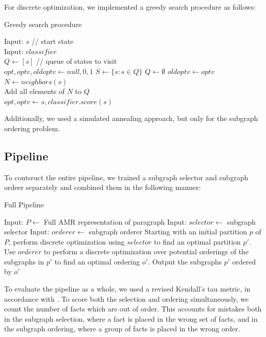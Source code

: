 \documentclass[12pt]{article}
\begin{document}
For discrete optimization, we implemented a greedy search procedure as follows:
\begin{algorithm}
\caption{Greedy search procedure}
\label{greedy_search_alg}
\begin{algorithmic}
\STATE Input: $s$ // start state \\
\STATE Input: $classifier$ \\
\STATE $Q \gets [s]$ // queue of states to visit \\
\STATE $opt, optv, oldoptv \gets null, 0, 1$
    \STATE $S \gets \{s: s \in Q \}$
    \STATE $Q \gets \emptyset$
    \STATE $oldoptv \gets optv$
        \STATE $N \gets neighbors(s)$\\
        \STATE Add all elements of $N$ to $Q$\\
            \STATE $opt, optv \gets s, classifier.score(s)$\\
        \ENDIF
    \ENDFOR
\ENDWHILE
\end{algorithmic}
\end{algorithm}

Additionally, we used a simulated annealing approach, but only for the
subgraph ordering problem.

\subsection{Pipeline}

To contsruct the entire pipeline, we trained a subgraph selector and subgraph
ordeer separately and combined them in the following manner:

\begin{algorithm}
\caption{Full Pipeline}
\label{pipeline_procedure}
\begin{algorithmic}
\STATE Input: $P \gets$ Full AMR representation of paragraph
\STATE Input: $selector \gets$ subgraph selector
\STATE Input: $orderer \gets$ subgraph orderer
\STATE Starting with an initial partition $p$ of $P$, perform discrete
optimization using $selector$ to find an optimal partition $p'$.
\STATE Use $orderer$ to perform a discrete optimization over potential
orderings of the subgraphs in $p'$ to find an optimal ordering $o'$.
\STATE Output the subgraphs $p'$ ordered by $o'$
\end{algorithmic}
\end{algorithm}

To evaluate the pipeline as a whole, we used a revised Kendall's tau metric, in
accordance with \cite{lapata2006automatic}. To score both the selection and
ordering simultaneously, we count the number of facts which are out of order.
This accounts for mistakes both in the subgraph selection, where a fact is
placed in the wrong set of facts, and in the subgraph ordering, where a group
of facts is placed in the wrong order.
\end{document}
